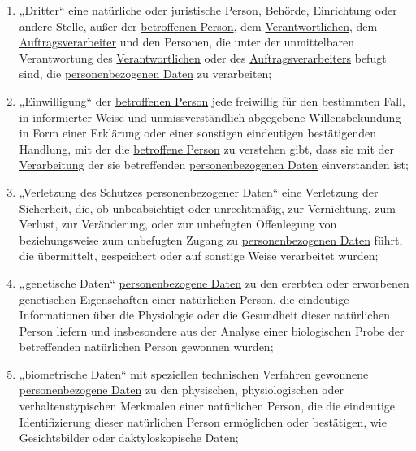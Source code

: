 \begin{enumerate}
  \item „Dritter“ eine natürliche oder juristische Person, Behörde, Einrichtung oder andere Stelle, außer der
   \hyperref[itm:04-1]{betroffenen Person}, dem \hyperref[itm:04-7]{Verantwortlichen}, dem \hyperref[itm:04-8]
    {Auftragsverarbeiter} und den Personen, die unter der unmittelbaren Verantwortung des \hyperref[itm:04-7]
    {Verantwortlichen} oder des \hyperref[itm:04-8]{Auftragsverarbeiters} befugt sind, die \hyperref[itm:04-1]
    {personenbezogenen Daten} zu verarbeiten;%
  \label{itm:04-10}

  \item „Einwilligung“ der \hyperref[itm:04-1]{betroffenen Person} jede freiwillig für den bestimmten Fall, in
   informierter Weise und unmissverständlich abgegebene Willensbekundung in Form einer Erklärung oder einer sonstigen
   eindeutigen bestätigenden Handlung, mit der die \hyperref[itm:04-1]{betroffene Person} zu verstehen gibt, dass sie
   mit der \hyperref[itm:04-2]{Verarbeitung} der sie betreffenden \hyperref[itm:04-1]{personenbezogenen Daten}
   einverstanden ist;%
  \label{itm:04-11}

  \item „Verletzung des Schutzes personenbezogener Daten“ eine Verletzung der Sicherheit, die, ob unbeabsichtigt oder
   unrechtmäßig, zur Vernichtung, zum Verlust, zur Veränderung, oder zur unbefugten Offenlegung von beziehungsweise zum
   unbefugten Zugang zu \hyperref[itm:04-1]{personenbezogenen Daten} führt, die übermittelt, gespeichert oder auf
   sonstige Weise verarbeitet wurden;%
  \label{itm:04-12}

  \item „genetische Daten“ \hyperref[itm:04-1]{personenbezogene Daten} zu den ererbten oder erworbenen genetischen
   Eigenschaften einer natürlichen Person, die eindeutige Informationen über die Physiologie oder die Gesundheit dieser
   natürlichen Person liefern und insbesondere aus der Analyse einer biologischen Probe der betreffenden natürlichen
   Person gewonnen wurden;%
  \label{itm:04-13}

  \item „biometrische Daten“ mit speziellen technischen Verfahren gewonnene \hyperref[itm:04-1]{personenbezogene Daten}
   zu den physischen, physiologischen oder verhaltenstypischen Merkmalen einer natürlichen Person, die die eindeutige
   Identifizierung dieser natürlichen Person ermöglichen oder bestätigen, wie Gesichtsbilder oder daktyloskopische
   Daten;%
  \label{itm:04-14}


\end{enumerate}
